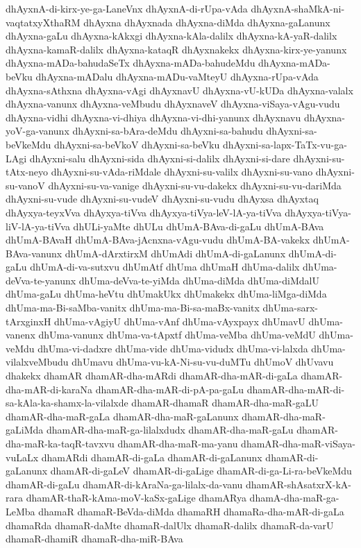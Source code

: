 {dhAyxnA-di-kirx-ye-ga-LaneVnx
dhAyxnA-di-rUpa-vAda
dhAyxnA-shaMkA-ni-vaqtatxyXthaRM
dhAyxna
dhAyxnada
dhAyxna-diMda
dhAyxna-gaLanunx
dhAyxna-gaLu
dhAyxna-kAkxgi
dhAyxna-kAla-dalilx
dhAyxna-kA-yaR-dalilx
dhAyxna-kamaR-dalilx
dhAyxna-kataqR
dhAyxnakekx
dhAyxna-kirx-ye-yanunx
dhAyxna-mADa-bahudaSeTx
dhAyxna-mADa-bahudeMdu
dhAyxna-mADa-beVku
dhAyxna-mADalu
dhAyxna-mADu-vaMteyU
dhAyxna-rUpa-vAda
dhAyxna-sAthxna
dhAyxna-vAgi
dhAyxnavU
dhAyxna-vU-kUDa
dhAyxna-valalx
dhAyxna-vanunx
dhAyxna-veMbudu
dhAyxnaveV
dhAyxna-viSaya-vAgu-vudu
dhAyxna-vidhi
dhAyxna-vi-dhiya
dhAyxna-vi-dhi-yanunx
dhAyxnavu
dhAyxna-yoV-ga-vanunx
dhAyxni-sa-bAra-deMdu
dhAyxni-sa-bahudu
dhAyxni-sa-beVkeMdu
dhAyxni-sa-beVkoV
dhAyxni-sa-beVku
dhAyxni-sa-lapx-TaTx-vu-ga-LAgi
dhAyxni-salu
dhAyxni-sida
dhAyxni-si-dalilx
dhAyxni-si-dare
dhAyxni-su-tAtx-neyo
dhAyxni-su-vAda-riMdale
dhAyxni-su-valilx
dhAyxni-su-vano
dhAyxni-su-vanoV
dhAyxni-su-va-vanige
dhAyxni-su-vu-dakekx
dhAyxni-su-vu-dariMda
dhAyxni-su-vude
dhAyxni-su-vudeV
dhAyxni-su-vudu
dhAyxsa
dhAyxtaq
dhAyxya-teyxVva
dhAyxya-tiVva
dhAyxya-tiVya-leV-lA-ya-tiVva
dhAyxya-tiVya-liV-lA-ya-tiVva
dhULi-yaMte
dhULu
dhUmA-BAva-di-gaLu
dhUmA-BAva
dhUmA-BAvaH
dhUmA-BAva-jAcnxna-vAgu-vudu
dhUmA-BA-vakekx
dhUmA-BAva-vanunx
dhUmA-dArxtirxM
dhUmAdi
dhUmA-di-gaLanunx
dhUmA-di-gaLu
dhUmA-di-va-sutxvu
dhUmAtf
dhUma
dhUmaH
dhUma-dalilx
dhUma-deVva-te-yanunx
dhUma-deVva-te-yiMda
dhUma-diMda
dhUma-diMdalU
dhUma-gaLu
dhUma-heVtu
dhUmakUkx
dhUmakekx
dhUma-liMga-diMda
dhUma-ma-Bi-saMba-vanitx
dhUma-ma-Bi-sa-maBx-vanitx
dhUma-sarx-tArxginxH
dhUma-vAgiyU
dhUma-vAnf
dhUma-vAyxpayx
dhUmavU
dhUma-vanenx
dhUma-vanunx
dhUma-va-tApxtf
dhUma-veMba
dhUma-veMdU
dhUma-veMdu
dhUma-vi-dadxre
dhUma-vide
dhUma-vidudx
dhUma-vi-lalxda
dhUma-vilalxveMbudu
dhUmavu
dhUma-vu-kA-Ni-su-vu-duMTu
dhUmoV
dhUvavu
dhakekx
dhamAR
dhamAR-dha-mARdi
dhamAR-dha-mAR-di-gaLa
dhamAR-dha-mAR-di-karaNa
dhamAR-dha-mAR-di-pA-pa-gaLu
dhamAR-dha-mAR-di-sa-kAla-ka-shamx-la-vilalxde
dhamAR-dhamaR
dhamAR-dha-maR-gaLU
dhamAR-dha-maR-gaLa
dhamAR-dha-maR-gaLanunx
dhamAR-dha-maR-gaLiMda
dhamAR-dha-maR-ga-lilalxdudx
dhamAR-dha-maR-gaLu
dhamAR-dha-maR-ka-taqR-tavxvu
dhamAR-dha-maR-ma-yanu
dhamAR-dha-maR-viSaya-vuLaLx
dhamARdi
dhamAR-di-gaLa
dhamAR-di-gaLanunx
dhamAR-di-gaLanunx
dhamAR-di-gaLeV
dhamAR-di-gaLige
dhamAR-di-ga-Li-ra-beVkeMdu
dhamAR-di-gaLu
dhamAR-di-kAraNa-ga-lilalx-da-vanu
dhamAR-shAsatxrX-kA-rara
dhamAR-thaR-kAma-moV-kaSx-gaLige
dhamARya
dhamA-dha-maR-ga-LeMba
dhamaR
dhamaR-BeVda-diMda
dhamaRH
dhamaRa-dha-mAR-di-gaLa
dhamaRda
dhamaR-daMte
dhamaR-dalUlx
dhamaR-dalilx
dhamaR-da-varU
dhamaR-dhamiR
dhamaR-dha-miR-BAva
}
